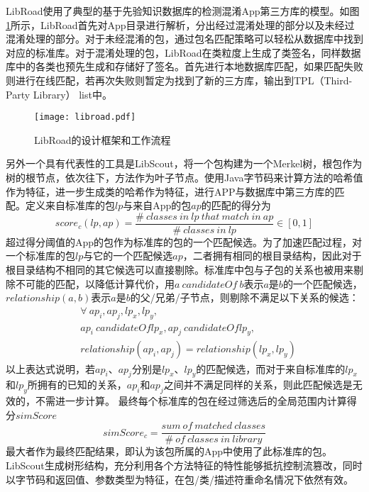 LibRoad\cite{xu2020libroad}使用了典型的基于先验知识数据库的检测混淆App第三方库的模型。如图\ref{fig:libroad}所示，LibRoad首先对App目录进行解析，分出经过混淆处理的部分以及未经过混淆处理的部分。对于未经混淆的包，通过包名匹配策略可以轻松从数据库中找到对应的标准库。对于混淆处理的包，LibRoad在类粒度上生成了类签名，同样数据库中的各类也预先生成和存储好了签名。首先进行本地数据库匹配，如果匹配失败则进行在线匹配，若再次失败则暂定为找到了新的三方库，输出到TPL（Third-Party Library） list中。

\begin{figure}[!htp]
  \centering
  \texttt{[image: libroad.pdf]} \\
  \caption{LibRoad的设计框架和工作流程}
 \label{fig:libroad}
\end{figure}

另外一个具有代表性的工具是LibScout\cite{backes2016reliable}，将一个包构建为一个Merkel树，根包作为树的根节点，依次往下，方法作为叶子节点。使用Java字节码来计算方法的哈希值作为特征，进一步生成类的哈希作为特征，进行APP与数据库中第三方库的匹配。定义来自标准库的包$lp$与来自App的包$ap$的匹配的得分为
\begin{equation}
score_c(lp,ap)=\frac{\#\ classes\ in\ lp\ that\ match\ in\ ap}{\#\ classes\ in\ lp} \in [0,1]
\end{equation}
超过得分阈值的App的包作为标准库的包的一个匹配候选。为了加速匹配过程，对一个标准库的包$lp$与它的一个匹配候选$ap$，二者拥有相同的根目录结构，因此对于根目录结构不相同的其它候选可以直接剔除。标准库中包与子包的关系也被用来剔除不可能的匹配，以降低计算代价，用$a\ candidateOf\ b$表示$a$是$b$的一个匹配候选，$relationship(a,b)$表示$a$是$b$的父/兄弟/子节点，则剔除不满足以下关系的候选：
\begin{equation}
\begin{aligned}
&\forall \ ap_i,ap_j,lp_x,lp_y,\\
& ap_i\ candidateOf lp_x,ap_j\ candidateOf lp_y,\\
& relationship(ap_i,ap_j)=relationship(lp_x,lp_y)
\end{aligned}
\end{equation}
以上表达式说明，若$ap_i$、$ap_j$分别是$lp_x$、$lp_y$的匹配候选，而对于来自标准库的$lp_x$和$lp_y$所拥有的已知的关系，$ap_i$和$ap_j$之间并不满足同样的关系，则此匹配候选是无效的，不需进一步计算。
最终每个标准库的包在经过筛选后的全局范围内计算得分$simScore$
\begin{equation}
simScore_c=\frac{sum\ of \ matched\ classes}{\#\ of\ classes\ in\ library}
\end{equation}
最大者作为最终匹配结果，即认为该包所属的App中使用了此标准库的包。LibScout生成树形结构，充分利用各个方法特征的特性能够抵抗控制流篡改，同时以字节码和返回值、参数类型为特征，在包/类/描述符重命名情况下依然有效。




